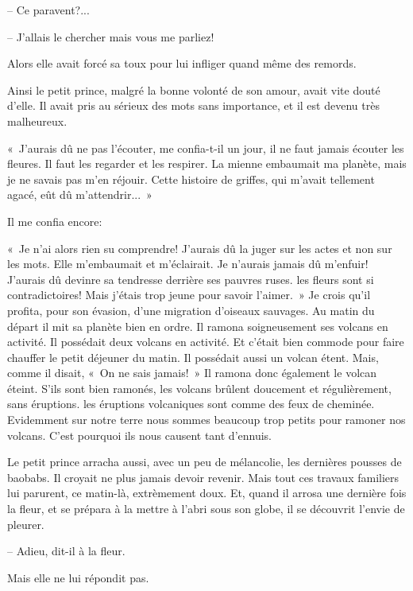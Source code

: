 \documentclass[a4paper]{report}
\begin{document}
-- Ce paravent?...

-- J'allais le chercher mais vous me parliez!

Alors elle avait forcé sa toux pour lui infliger quand même des remords.

Ainsi le petit prince, malgré la bonne volonté de son amour, avait vite douté d'elle. Il avait pris au sérieux des mots sans importance, et il est devenu très malheureux.

«~J'aurais dû ne pas l'écouter, me confia-t-il un jour, il ne faut jamais écouter les fleures. Il faut les regarder et les respirer. La mienne embaumait ma planète, mais je ne savais pas m'en réjouir. Cette histoire de griffes, qui m'avait tellement agacé, eût dû m'attendrir...~»

Il me confia encore:

«~Je n'ai alors rien su comprendre! J'aurais dû la juger sur les actes et non sur les mots. Elle m'embaumait et m'éclairait. Je n'aurais jamais dû m'enfuir! J'aurais dû devinre sa tendresse derrière ses pauvres ruses. les fleurs sont si contradictoires! Mais j'étais trop jeune pour savoir l'aimer.~»
\parachapter[IX]{} %
Je crois qu'il profita, pour son évasion, d'une migration d'oiseaux sauvages. Au matin du départ il mit sa planète bien en ordre. Il ramona soigneusement ses volcans en activité. Il possédait deux volcans en activité. Et c'était bien commode pour faire chauffer le petit déjeuner du matin. Il possédait aussi un volcan étent. Mais, comme il disait, «~On ne sais jamais!~» Il ramona donc également le volcan éteint. S'ils sont bien ramonés, les volcans brûlent doucement et régulièrement, sans éruptions. les éruptions volcaniques sont comme des feux de cheminée. Evidemment sur notre terre nous sommes beaucoup trop petits pour ramoner nos volcans. C'est pourquoi ils nous causent tant d'ennuis. 


Le petit prince arracha aussi, avec un peu de mélancolie, les dernières pousses de baobabs. Il croyait ne plus jamais devoir revenir. Mais tout ces travaux familiers lui parurent, ce matin-là, extrèmement doux. Et, quand il arrosa une dernière fois la fleur, et se prépara à la mettre à l'abri sous son globe, il se découvrit l'envie de pleurer.

-- Adieu, dit-il à la fleur.

Mais elle ne lui répondit pas.
\end{document}

